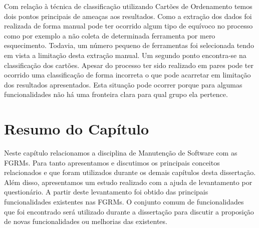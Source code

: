 Com relação à técnica de classificação utilizando Cartões de Ordenamento temos
dois pontos principais de ameaças aos resultados. Como a extração dos dados foi
realizada de forma manual pode ter ocorrido algum tipo de equívoco no processo
como por exemplo a  não coleta de determinada ferramenta por mero esquecimento.
Todavia, um número pequeno de ferramentas foi selecionada tendo em vista a
limitação desta extração manual. Um segundo ponto encontra-se na classificação
dos cartões. Apesar do processo ter sido realizado em pares pode ter ocorrido
uma classificação de forma incorreta o que pode acarretar em limitação dos
resultados apresentados. Esta situação pode ocorrer porque para algumas
funcionalidades não há uma fronteira clara para qual grupo ela pertence.

\section{Resumo do Capítulo}
\label{sec:resumo_do_capitulo}

Neste capítulo relacionamos a disciplina de Manutenção de Software com as FGRMs.
Para tanto apresentamos e discutimos os principais conceitos relacionados e que
foram utilizados durante os demais capítulos desta dissertação. Além disso,
apresentamos um estudo realizado com a ajuda de levantamento por questionário. A
partir deste levantamento foi obtido das principais funcionalidades existentes
nas FGRMs. O conjunto comum de funcionalidades que foi encontrado será utilizado
durante a dissertação para discutir a proposição de novas funcionalidades ou
melhorias das existentes.
